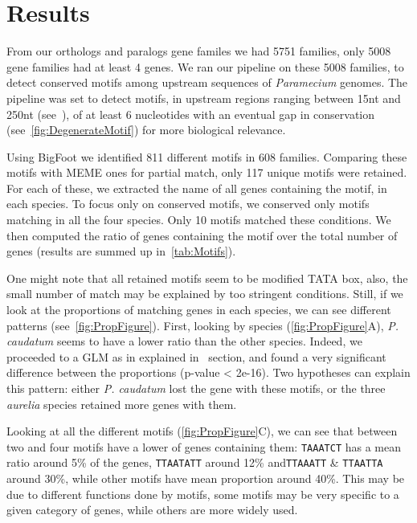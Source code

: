 \section*{Results}
\label{sec:Results}

From our orthologs and paralogs gene familes we had 5751 families, only 5008 gene families had at least 4 genes. We ran our pipeline on these 5008 families, to detect conserved motifs among upstream sequences of \textit{Paramecium} genomes. The pipeline was set to detect motifs, in upstream regions ranging between 15nt and 250nt (see~), of at least 6 nucleotides with an eventual gap in conservation (see~\autoref{fig:DegenerateMotif}) for more biological relevance.

Using BigFoot we identified 811 different motifs in 608 families. Comparing these motifs with MEME ones for partial match, only 117 unique motifs were retained. For each of these, we extracted the name of all genes containing the motif, in each species. To focus only on conserved motifs, we conserved only motifs matching in all the four species. Only 10 motifs matched these conditions. We then computed the ratio of genes containing the motif over the total number of genes (results are summed up in~\autoref{tab:Motifs}).

One might note that all retained motifs seem to be modified TATA box, also, the small number of match may be explained by too stringent conditions. Still, if we look at the proportions of matching genes in each species, we can see different patterns (see~\autoref{fig:PropFigure}). First, looking by species (\autoref{fig:PropFigure}A), \textit{P. caudatum} seems to have a lower ratio than the other species. Indeed, we proceeded to a GLM as in explained in~ section, and found a very significant difference between the proportions (p-value < 2e-16). Two hypotheses can explain this pattern: either \textit{P. caudatum} lost the gene with these motifs, or the three \textit{aurelia} species retained more genes with them.

Looking at all the different motifs (\autoref{fig:PropFigure}C), we can see that between two and four motifs have a lower of genes containing them: \texttt{TAAATCT} has a mean ratio around 5\% of the genes, \texttt{TTAATATT} around 12\% and\texttt{TTAAATT} \& \texttt{TTAATTA} around 30\%, while other motifs have mean proportion around 40\%. This may be due to different functions done by motifs, some motifs may be very specific to a given category of genes, while others are more widely used.

